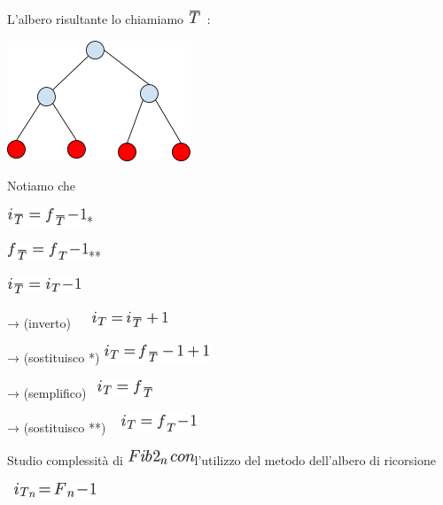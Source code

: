 \documentclass{article}
\begin{document}
{L'albero risultante lo chiamiamo
}\includegraphics{images/image44.png}{~:}

{\includegraphics{images/image522.png}}

{Notiamo che }

\includegraphics{images/image45.png}{*}

\includegraphics{images/image46.png}{**}

\includegraphics{images/image47.png}{~ ~}

{→ (inverto) ~ ~}\includegraphics{images/image48.png}{~ }

{→ (sostituisco }{*}{) }\includegraphics{images/image49.png}

{→ (semplifico) ~}\includegraphics{images/image50.png}{~ }

{→ (sostituisco }{**}{) ~ }\includegraphics{images/image38.png}

{Studio complessità di }\includegraphics{images/image51.png}{l'utilizzo del metodo dell'albero di ricorsione}

{~}\includegraphics{images/image52.png}
\end{document}
